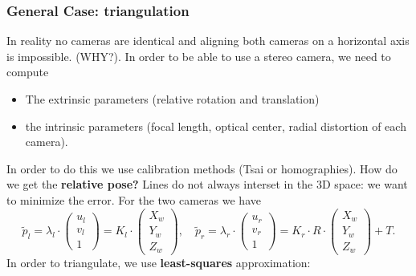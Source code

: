 \documentclass[a4paper,12 pt]{article}
\theoremstyle{definition}
\theoremstyle{remark}
\theoremstyle{definition}
\theoremstyle{definition}
\theoremstyle{definition}
\theoremstyle{remark}
\theoremstyle{definition}
\begin{document}
\subsubsection*{General Case: triangulation}
In reality no cameras are identical and aligning both cameras on a horizontal axis is impossible. (WHY?). In order to be able to use a stereo camera, we need to compute
\begin{itemize}
\item The extrinsic parameters (relative rotation and translation)
\item the intrinsic parameters (focal length, optical center, radial distortion of each camera).
\end{itemize}
In order to do this we use calibration methods (Tsai or homographies). How do we get the \textbf{relative pose?} Lines do not always interset in the 3D space: we want to minimize the error. For the two cameras we have
\begin{equation}
\tilde{p}_l=\lambda_l\cdot \begin{pmatrix}
 u_l\\
 v_l\\
 1
 \end{pmatrix}=K_l\cdot \begin{pmatrix}
 X_w\\
 Y_w\\
 Z_w
 \end{pmatrix}, \quad \tilde{p}_r=\lambda_r\cdot \begin{pmatrix}
 u_r\\
 v_r\\
 1
 \end{pmatrix}=K_r\cdot R\cdot \begin{pmatrix}
 X_w\\
 Y_w\\
 Z_w
 \end{pmatrix}+T. 
\end{equation}
In order to triangulate, we use \textbf{least-squares} approximation:
\end{document}
